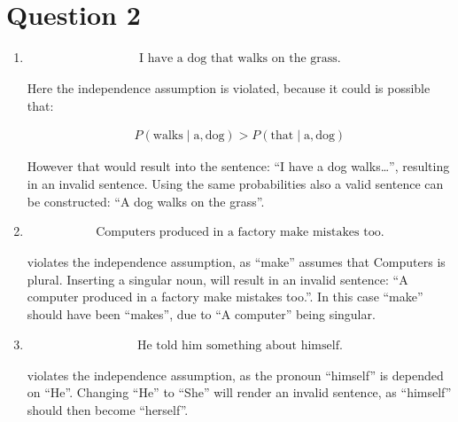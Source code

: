 \documentclass[a4paper]{article}
\begin{document}
\section*{Question 2}

\begin{enumerate}
    \item
        \begin{align}
            \text{I have a dog that walks on the grass.}
        \end{align}

        Here the independence assumption is violated, because it could is
        possible that:

        \begin{align}
            P(\text{walks} \mid \text{a}, \text{dog}) >
            P(\text{that} \mid \text{a}, \text{dog})
        \end{align}

        However that would result into the sentence: ``I have a dog
        walks\ldots'', resulting in an invalid sentence. Using the same
        probabilities also a valid sentence can be constructed: ``A dog walks on
        the grass''.

    \item
        \begin{align}
            \text{Computers produced in a factory make mistakes too.}
        \end{align}

        violates the independence assumption, as ``make'' assumes that Computers
        is plural. Inserting a singular noun, will result in an invalid
        sentence: ``A computer produced in a factory make mistakes too.''. In
        this case ``make'' should have been ``makes'', due to ``A computer''
        being singular.

    \item
        \begin{align}
            \text{He told him something about himself.}
        \end{align}

        violates the independence assumption, as the pronoun ``himself'' is
        depended on ``He''. Changing ``He'' to ``She'' will render an invalid
        sentence, as ``himself'' should then become ``herself''.
\end{enumerate}
\end{document}
